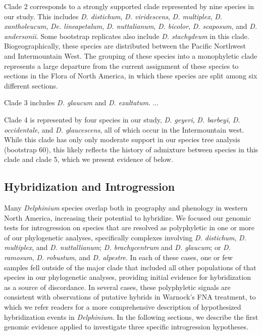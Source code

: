 \documentclass[11pt]{article}
\begin{document}
Clade 2 corresponds to a strongly supported clade represented by nine 
species in our study. This includes \emph{D. distichum}, \emph{D. viridescens},
\emph{D. multiplex}, \emph{D. xantholeucum}, \emph{De. lineapetalum}, 
\emph{D. nuttalianum}, \emph{D. bicolor}, \emph{D. scaposum}, and
\emph{D. andersonii}. Some bootstrap replicates also include 
\emph{D. stachydeum} in this clade. Biogeographically, these species are distributed
between the Pacific Northwest and Intermountain West. The grouping
of these species into a monophyletic clade represents a large departure
from the current assignment of these species to sections in the Flora of
North America, in which these species are split among six different sections.


Clade 3 includes \emph{D. glaucum} and \emph{D. exaltatum}. ...


Clade 4 is represented by four species in our study, 
\emph{D. geyeri}, \emph{D. barbeyi}, \emph{D. occidentale}, and 
\emph{D. glaucescens}, all of which occur in the Intermountain west. 
While this clade has only only moderate support in our species
tree analysis (bootstrap 60), this likely reflects the history of admixture
between species in this clade and clade 5, which we present evidence 
of below.


\subsection{Hybridization and Introgression}
Many \emph{Delphinium} species overlap both in geography and phenology in western 
North America, increasing their potential to hybridize. 
We focused our genomic tests for introgression on species that are resolved as 
polyphyletic in one or more of our phylogenetic analyses, specifically complexes
involving \emph{D. distichum}, \emph{D. multiplex}, and \emph{D. nuttallianum}; 
\emph{D. brachycentrum} and \emph{D. glaucum}; 
or \emph{D. ramosum}, \emph{D. robustum}, and \emph{D. alpestre}. 
% 
In each of these cases, one or few samples fell outside of the major clade that 
included all other populations of that species in our phylogenetic analyses, 
providing initial evidence for hybridization as a source of discordance. 
In several cases, these polyphyletic signals are consistent with observations of 
putative hybrids in Warnock’s FNA treatment, to which we refer readers for a more
comprehensive description of hypothesized hybridization events in \emph{Delphinium}. 
In the following sections, we describe the first genomic evidence applied to 
investigate three specific introgression hypotheses.
\end{document}
